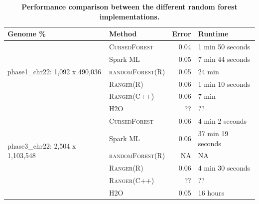 \documentclass[10pt,letterpaper]{article}
\newcommand{\cursedforest}{\textsc{CursedForest}\xspace}
\newcommand{\ranger}{\textsc{Ranger}\xspace}
\newcommand{\randomforest}{\textsc{randomForest}\xspace}
\begin{document}
\begin{table}[!ht]
\begin{minipage}{\textwidth}
\centering
\caption{ {\bf Performance comparison between the different random forest implementations.}}
\begin{tabular}{| l | l | r | l |}
\hline
\bf{Genome \%}                      & \bf{Method} & \bf{Error}  & \bf{Runtime}  \\

\hline

\multirow{5}{*}{phase1\_chr22: 1,092 x 490,036} & \cursedforest & 0.04  & 1 min 50 seconds    \\ %
                                                & Spark ML  &  0.05           &           7 min 44 seconds         \\  %
                                                & \randomforest (R)         & 0.05       & 24 min           \\ %
                                                & \ranger (R)      & 0.06       & 1 min 10 seconds       \\ %
                                                & \ranger (C++)     & 0.06       & 7 min            \\ %
                                                & H2O           & ??       & ??         \\

\hline

\multirow{5}{*}{phase3\_chr22: 2,504 x 1,103,548}   & \cursedforest & 0.06 & 4 min 2 seconds \\  %
                                                    & Spark ML  & 0.06 & 37 min 19 seconds \\  %
                                                    & \randomforest (R)        & NA         & NA                \\
                                                    & \ranger (R)    & 0.06       & 4 min 30 seconds     \\  %
                                                    & \ranger (C++)     &     ??   & ??        \\
                                                    & H2O           & 0.05       & 16 hours         \\ %

\hline


\end{tabular}
\end{minipage}
\end{table}
\end{document}
